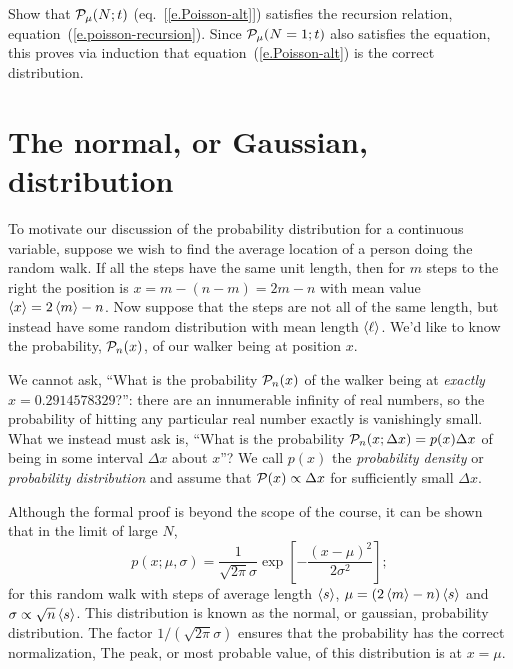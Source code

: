 \begin{exercisebox}
Show that $\mathcal{P}_{\mu}(N;t)$ (eq.~[\ref{e.Poisson-alt}]) satisfies the recursion relation, equation~(\ref{e.poisson-recursion}). Since $\mathcal{P}_{\mu}(N=1;t)$ also satisfies the equation, this proves via induction that equation~(\ref{e.Poisson-alt}) is the correct distribution.
\end{exercisebox}

\section{The normal, or Gaussian, distribution}

To motivate our discussion of the probability distribution for a continuous variable, suppose we wish to find the average location of a person doing the random walk.  If all the steps have the same unit length, then for $m$ steps to the right the position is $x = m - (n-m) = 2m-n$ with mean value $\left\langle x\right\rangle = 2\left\langle m\right\rangle-n$.  Now suppose that the steps are not all of the same length, but instead have some random distribution with mean length $\left\langle\ell\right\rangle$. We'd like to know the probability, $\mathcal{P}_{n}(x)$, of our walker being at  position $x$.

We cannot ask, ``What is the probability $\mathcal{P}_{n}(x)$ of the walker being at \emph{exactly} $x=0.2914578329$?'': there are an innumerable infinity of real numbers, so the probability of hitting any particular real number exactly is vanishingly small.  What we instead must ask is, ``What is the probability $\mathcal{P}_{n}(x;\Delta x) = p(x)\Delta x$ of being in some interval $\Delta x$ about $x$''?  We call $p(x)$ the \emph{probability density} or \emph{probability distribution} and assume that $\mathcal{P}(x) \propto \Delta x$ for sufficiently small $\Delta x$.

Although the formal proof is beyond the scope of the course, it can be shown that in the limit of large $N$,
\begin{equation}\label{e.gaussian}
p(x; \mu,\sigma) = \frac{1}{\sqrt{2\pi}\sigma} \exp\left[-\frac{\left(x-\mu\right)^{2}}{2\sigma^{2}}\right];
\end{equation}
for this random walk with steps of average length $\left\langle s\right\rangle$, $\mu = (2\left\langle m\right\rangle-n)\left\langle s\right\rangle$ and $\sigma  \propto \sqrt{n}\left\langle s\right\rangle$.  This distribution is known as the normal, or gaussian, probability distribution.  The factor $1/(\sqrt{2\pi}\sigma)$ ensures that the probability has the correct normalization,
The peak, or most probable value, of this distribution is at $x=\mu$.

